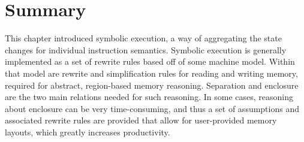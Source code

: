 \section{Summary}
This chapter introduced symbolic execution,
a way of aggregating the state changes for individual instruction semantics.
Symbolic execution is generally implemented as a set of rewrite rules
based off of some machine model.
Within that model are rewrite and simplification rules
for reading and writing memory,
required for abstract, region-based memory reasoning.
Separation and enclosure are the two main relations needed for such reasoning.
In some cases, reasoning about enclosure can be very time-consuming,
and thus a set of assumptions and associated rewrite rules are provided 
that allow for user-provided memory layouts, which greatly increases productivity.
